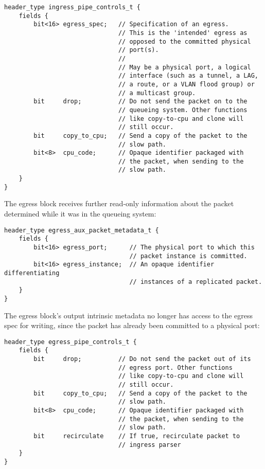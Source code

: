 \begin{lstlisting}[style=P4style]
header_type ingress_pipe_controls_t {
    fields {
        bit<16> egress_spec;   // Specification of an egress.
                               // This is the 'intended' egress as
                               // opposed to the committed physical
                               // port(s).
                               //
                               // May be a physical port, a logical
                               // interface (such as a tunnel, a LAG,
                               // a route, or a VLAN flood group) or
                               // a multicast group.
        bit     drop;          // Do not send the packet on to the
                               // queueing system. Other functions
                               // like copy-to-cpu and clone will
                               // still occur.
        bit     copy_to_cpu;   // Send a copy of the packet to the
                               // slow path.
        bit<8>  cpu_code;      // Opaque identifier packaged with
                               // the packet, when sending to the
                               // slow path.
    }
}
\end{lstlisting}

The egress block receives further read-only information about the packet
determined while it was in the queueing system:

\begin{lstlisting}[style=P4style]
header_type egress_aux_packet_metadata_t {
    fields {
        bit<16> egress_port;      // The physical port to which this
                                  // packet instance is committed.
        bit<16> egress_instance;  // An opaque identifier differentiating
                                  // instances of a replicated packet.
    }
}
\end{lstlisting}

The egress block's output intrinsic metadata no longer has access to the egress
spec for writing, since the packet has already been committed to a physical
port:

\begin{lstlisting}[style=P4style]
header_type egress_pipe_controls_t {
    fields {
        bit     drop;          // Do not send the packet out of its
                               // egress port. Other functions
                               // like copy-to-cpu and clone will
                               // still occur.
        bit     copy_to_cpu;   // Send a copy of the packet to the
                               // slow path.
        bit<8>  cpu_code;      // Opaque identifier packaged with
                               // the packet, when sending to the
                               // slow path.
        bit     recirculate    // If true, recirculate packet to
                               // ingress parser
    }
}
\end{lstlisting}


